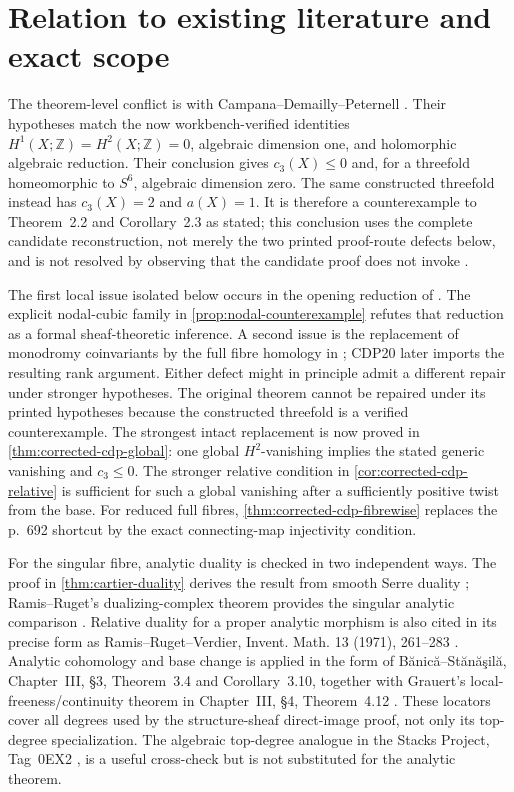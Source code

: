 \section{Relation to existing literature and exact scope}

The theorem-level conflict is with Campana--Demailly--Peternell
\cite[Theorem~2.2 and Corollary~2.3, p.~680]{CDP2020}.  Their hypotheses match
the now workbench-verified identities
$H^1(X;\mathbb Z)=H^2(X;\mathbb Z)=0$, algebraic dimension one, and
holomorphic algebraic reduction.  Their conclusion gives $c_3(X)\leq0$ and,
for a threefold homeomorphic to $S^6$, algebraic dimension zero.  The same
constructed threefold instead has $c_3(X)=2$ and $a(X)=1$.  It is therefore a
counterexample to Theorem~2.2 and Corollary~2.3 as stated; this conclusion uses
the complete candidate reconstruction, not merely the two printed proof-route
defects below, and is not resolved by observing that the candidate proof does
not invoke \cite{CDP2020}.

The first local issue isolated below occurs in the opening reduction of
\cite[\S7, p.~692]{CDP2020}.  The explicit nodal-cubic family in
\cref{prop:nodal-counterexample} refutes that reduction as a formal
sheaf-theoretic inference.  A second issue is the replacement of monodromy
coinvariants by the full fibre homology in
\cite[Lemma~3.2, pp.~84--85]{CDP1998}; CDP20 later imports the resulting
rank argument.  Either defect might in principle admit a different repair
under stronger hypotheses.  The original theorem cannot be repaired under
its printed hypotheses because the constructed threefold is a verified
counterexample.  The strongest intact replacement is now proved in
\cref{thm:corrected-cdp-global}: one global \(H^2\)-vanishing implies the
stated generic vanishing and \(c_3\le0\).  The stronger relative condition in
\cref{cor:corrected-cdp-relative} is sufficient for such a global vanishing
after a sufficiently positive twist from the base.  For reduced full fibres,
\cref{thm:corrected-cdp-fibrewise} replaces the p.~692 shortcut by the exact
connecting-map injectivity condition.

For the singular fibre, analytic duality is checked in two independent ways.
The proof in \cref{thm:cartier-duality} derives the result from smooth Serre
duality \cite[Theorem~9.37]{Lee2024}; Ramis--Ruget's dualizing-complex theorem
provides the singular analytic comparison
\cite[Theorems~1--2, pp.~81--84, and Proposition~2, p.~91]{RamisRuget1970}.
Relative duality for a proper analytic morphism is also cited in its precise
form as Ramis--Ruget--Verdier, Invent. Math. 13 (1971), 261--283
\cite{RamisRugetVerdier1971}.  Analytic cohomology and base change is
applied in the form of B\u{a}nic\u{a}--St\u{a}n\u{a}\c{s}il\u{a},
Chapter~III, \S3, Theorem~3.4 and Corollary~3.10, together with Grauert's
local-freeness/continuity theorem in Chapter~III, \S4, Theorem~4.12
\cite{BanicaStanasila1976}.  These locators cover all degrees used by the
structure-sheaf direct-image proof, not only its top-degree specialization.
The algebraic top-degree analogue in the Stacks Project, Tag~0EX2
\cite{StacksProject}, is a useful cross-check but is not substituted for the
analytic theorem.

